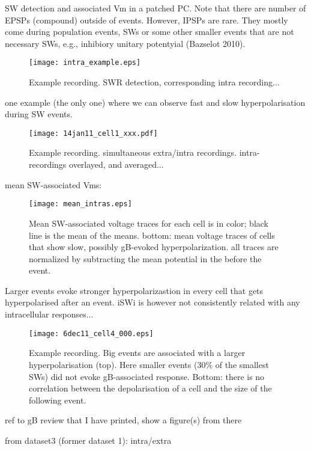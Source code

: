     SW detection and associated Vm in a patched PC.
    Note that there are number of EPSPs (compound) outside of events.
    However, IPSPs are rare. They mostly come during population events, SWs or
    some other smaller events that are not necessary SWs, e.g., inhibiory
    unitary potentyial (Bazselot 2010).
    \begin{figure}
      \texttt{[image: intra\_example.eps]}
      \caption{ Example recording. SWR detection, corresponding intra recording...
              }
    \end{figure}

    one example (the only one) where we can observe fast and slow
    hyperpolarisation during SW events. 
    \begin{figure}
      \texttt{[image: 14jan11\_cell1\_xxx.pdf]}
      \caption{ Example recording. simultaneous extra/intra recordings. 
        intra-recordings overlayed, and averaged...
              }
    \end{figure}

    mean SW-associated Vms:
    \begin{figure}
      \texttt{[image: mean\_intras.eps]}
      \caption{ Mean SW-associated voltage traces for each cell is in color;
        black line is the mean of the means. bottom: mean voltage traces of
        cells that show slow, possibly gB-evoked hyperpolarization. all
        traces are normalized by subtracting the mean potential in the before
        the event.
              }
    \end{figure}

    Larger events evoke stronger hyperpolarizastion in every cell that gets hyperpolarised after an event.
    iSWi is however not consistently related with any intracellular responses...

      \begin{figure}
        \texttt{[image: 6dec11\_cell4\_000.eps]}
        \caption{ Example recording. Big events are associated with a larger
          hyperpolarisation (top). Here smaller events (30\% of the smallest
          SWs) did not evoke gB-associated response. Bottom: there is no
          correlation between the depolarisation of a cell and the size of the
          following event.
                }
      \end{figure}
    
    ref to gB review that I have printed, show a figure(s) from there

    from dataset3 (former dataset 1): intra/extra

